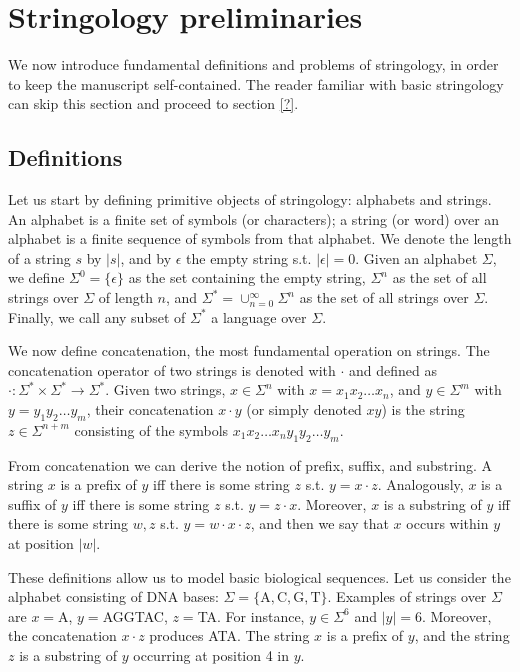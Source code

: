 
\section{Stringology preliminaries}

We now introduce fundamental definitions and problems of stringology, in order to keep the manuscript self-contained.
The reader familiar with basic stringology can skip this section and proceed to section \ref{?}.

\subsection{Definitions}

Let us start by defining primitive objects of stringology: alphabets and strings.
An alphabet is a finite set of symbols (or characters); a string (or word) over an alphabet is a finite sequence of symbols from that alphabet.
We denote the length of a string $s$ by $| s |$, and by $\epsilon$ the empty string s.t. $| \epsilon |=0$.
Given an alphabet $\Sigma$, we define $\Sigma^0=\{ \epsilon \}$ as the set containing the empty string, $\Sigma^n$ as the set of all strings over $\Sigma$ of length $n$, and $\Sigma^* = \cup_{n=0}^{\infty}{\Sigma^n}$ as the set of all strings over $\Sigma$.
Finally, we call any subset of $\Sigma^*$ a language over $\Sigma$.

We now define concatenation, the most fundamental operation on strings.
The concatenation operator of two strings is denoted with $\cdot$ and defined as $\cdot : \Sigma^* \times \Sigma^* \rightarrow \Sigma^*$.
Given two strings, $x \in \Sigma^n$ with $x=x_1 x_2 \dots x_n$, and $y \in \Sigma^m$ with $y=y_1 y_2 \dots y_m$, their concatenation $x \cdot y$ (or simply denoted $xy$) is the string $z \in \Sigma^{n+m}$ consisting of the symbols $x_1 x_2 \dots x_n y_1 y_2 \dots y_m$.

From concatenation we can derive the notion of prefix, suffix, and substring.
A string $x$ is a prefix of $y$ iff there is some string $z$ s.t. $y=x\cdot z$.
Analogously, $x$ is a suffix of $y$ iff there is some string $z$ s.t. $y=z\cdot x$.
Moreover, $x$ is a substring of $y$ iff there is some string $w,z$ s.t. $y=w\cdot x \cdot z$, and then we say that $x$ occurs within $y$ at position $|w|$.

\begin{example}
These definitions allow us to model basic biological sequences.
Let us consider the alphabet consisting of DNA bases: $\Sigma = \{\text{A},\text{C},\text{G},\text{T}\}$.
Examples of strings over $\Sigma$ are $x=$A, $y=$AGGTAC, $z=$TA.
For instance, $y \in \Sigma^6$ and $| y | = 6$.
Moreover, the concatenation $x \cdot z$ produces ATA.
The string $x$ is a prefix of $y$, and the string $z$ is a substring of $y$  occurring at position 4 in $y$.
\end{example}

